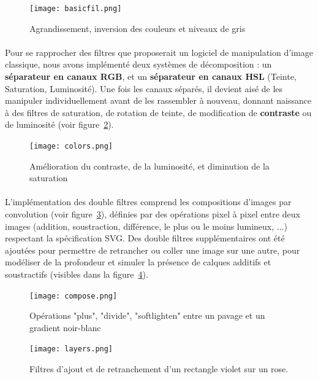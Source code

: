 \documentclass[a4paper]{article}
\begin{document}
\begin{figure}
    \centering
    \texttt{[image: basicfil.png]}
    \caption{Agrandissement, inversion des couleurs et niveaux de gris}
    \label{fig:basicfil}
\end{figure}

\paragraph{}
Pour se rapprocher des filtres que proposerait un logiciel de manipulation d'image classique, nous avons implémenté deux systèmes de décomposition : un \textbf{séparateur en canaux RGB}, et un \textbf{séparateur en canaux HSL}\cite{rgb2hsl} (Teinte, Saturation, Luminosité). Une fois les canaux séparés, il devient aisé de les manipuler individuellement avant de les rassembler à nouveau, donnant naissance à des filtres de saturation, de rotation de teinte, de modification de \textbf{contraste}\cite{contrast} ou de luminosité (voir figure~\ref{fig:colors}).

\begin{figure}
    \centering
    \texttt{[image: colors.png]}
    \caption{Amélioration du contraste, de la luminosité, et diminution de la saturation}
    \label{fig:colors}
\end{figure}

\paragraph{}
L'implémentation des double filtres comprend les compositions d'images par convolution (voir figure~\ref{fig:compose}), définies par des opérations pixel à pixel entre deux images (addition, soustraction, différence, le plus ou le moins lumineux, ...) respectant la spécification SVG\cite{composition}. Des double filtres supplémentaires ont été ajoutées pour permettre de retrancher ou coller une image sur une autre, pour modéliser de la profondeur et simuler la présence de calques additifs et soustractifs (visibles dans la figure~\ref{fig:layers}).

\begin{figure}
    \centering
    \texttt{[image: compose.png]}
    \caption{Opérations "plus", "divide", "softlighten" entre un pavage et un gradient noir-blanc}
    \label{fig:compose}
\end{figure}

\begin{figure}
    \centering
    \texttt{[image: layers.png]}
    \caption{Filtres d'ajout et de retranchement d'un rectangle violet sur un rose.}
    \label{fig:layers}
\end{figure}
\end{document}
